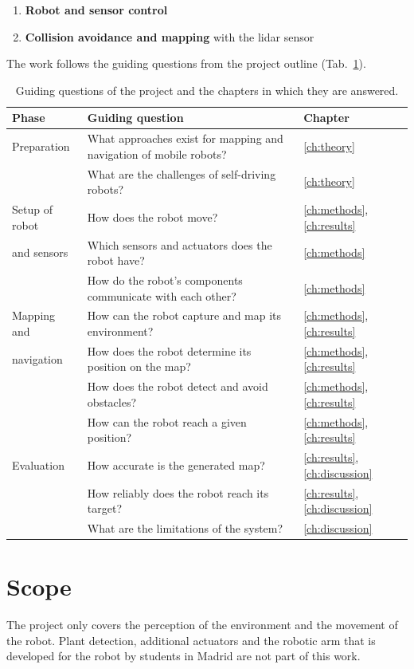 \begin{enumerate}
  \item \textbf{Robot and sensor control}
  \item \textbf{Collision avoidance and mapping} with the lidar sensor
\end{enumerate}

The work follows the guiding questions from the project outline (Tab.~\ref{tab:questions}).

\begin{table}[H]
  \centering
  \small
  \caption{Guiding questions of the project and the chapters in which they are answered.}
  \label{tab:questions}
  \begin{tabularx}{\textwidth}{@{}l X l@{}}
    \toprule
    \textbf{Phase} & \textbf{Guiding question} & \textbf{Chapter} \\
    \midrule
    Preparation        & What approaches exist for mapping and navigation of mobile robots? & \ref{ch:theory} \\
                       & What are the challenges of self-driving robots? & \ref{ch:theory} \\
    \midrule
    Setup of robot     & How does the robot move? & \ref{ch:methods}, \ref{ch:results} \\
    and sensors        & Which sensors and actuators does the robot have? & \ref{ch:methods} \\
                       & How do the robot's components communicate with each other? & \ref{ch:methods} \\
    \midrule
    Mapping and        & How can the robot capture and map its environment? & \ref{ch:methods}, \ref{ch:results} \\
    navigation         & How does the robot determine its position on the map? & \ref{ch:methods}, \ref{ch:results} \\
                       & How does the robot detect and avoid obstacles? & \ref{ch:methods}, \ref{ch:results} \\
                       & How can the robot reach a given position? & \ref{ch:methods}, \ref{ch:results} \\
    \midrule
    Evaluation         & How accurate is the generated map? & \ref{ch:results}, \ref{ch:discussion} \\
                       & How reliably does the robot reach its target? & \ref{ch:results}, \ref{ch:discussion} \\
                       & What are the limitations of the system? & \ref{ch:discussion} \\
    \bottomrule
  \end{tabularx}
\end{table}

\section{Scope}

The project only covers the perception of the environment and the movement of the robot. Plant detection, additional actuators and the robotic arm that is developed for the robot by students in Madrid are not part of this work.